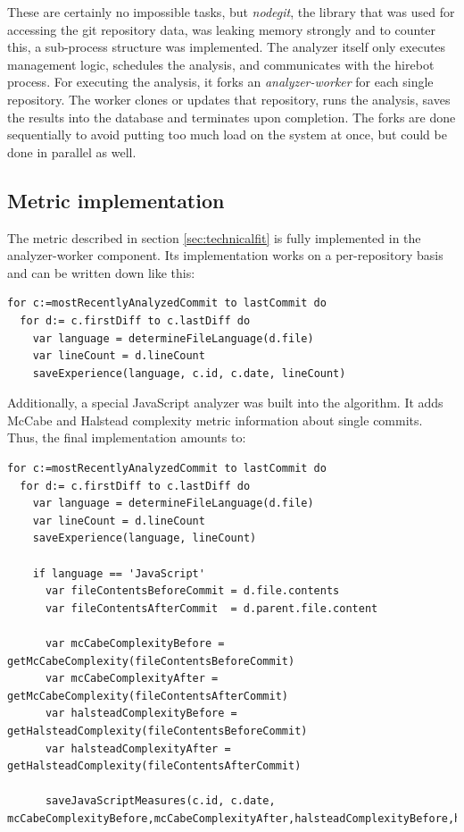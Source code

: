 These are certainly no impossible tasks, but \textit{nodegit}, the library
that was used for accessing the git repository data, was
leaking memory strongly and to counter this, a sub-process structure was
implemented. The analyzer itself only executes management logic,
schedules the analysis, and communicates with the hirebot process.
For executing the analysis, it forks an \textit{analyzer-worker} for each
single repository. The worker clones or updates that repository,
runs the analysis, saves the results into the database and terminates
upon completion. The forks are done sequentially to avoid putting
too much load on the system at once, but could be done in parallel as well.

\subsection{Metric implementation}\label{sec:metric-implementation}
The metric described in section \ref{sec:technicalfit} is fully implemented in the analyzer-worker component. Its implementation works on a per-repository basis and can be written down like this:

\begin{lstlisting}[frame=false]
for c:=mostRecentlyAnalyzedCommit to lastCommit do
  for d:= c.firstDiff to c.lastDiff do
    var language = determineFileLanguage(d.file)
    var lineCount = d.lineCount
    saveExperience(language, c.id, c.date, lineCount)
\end{lstlisting}

Additionally, a special JavaScript analyzer was built into the algorithm.
It adds McCabe\cite{mc:1976} and Halstead\cite{h:1977} complexity metric information about single
commits. Thus, the final implementation amounts to:

\begin{minipage}{\linewidth}
\begin{lstlisting}[frame=false]
for c:=mostRecentlyAnalyzedCommit to lastCommit do
  for d:= c.firstDiff to c.lastDiff do
    var language = determineFileLanguage(d.file)
    var lineCount = d.lineCount
    saveExperience(language, lineCount)

    if language == 'JavaScript'
      var fileContentsBeforeCommit = d.file.contents
      var fileContentsAfterCommit  = d.parent.file.content

      var mcCabeComplexityBefore = getMcCabeComplexity(fileContentsBeforeCommit)
      var mcCabeComplexityAfter = getMcCabeComplexity(fileContentsAfterCommit)
      var halsteadComplexityBefore = getHalsteadComplexity(fileContentsBeforeCommit)
      var halsteadComplexityAfter = getHalsteadComplexity(fileContentsAfterCommit)

      saveJavaScriptMeasures(c.id, c.date, mcCabeComplexityBefore,mcCabeComplexityAfter,halsteadComplexityBefore,halsteadComplexityAfter)
\end{lstlisting}
\end{minipage}


